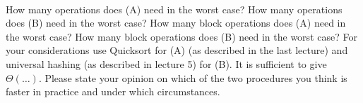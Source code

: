  \\
How many operations does (A) need in the worst case?
How many operations does (B) need in the worst case?
How many block operations does (A) need in the worst case?
How many block operations does (B) need in the worst case?
For your considerations use Quicksort for (A)
(as described in the last lecture) and universal hashing
(as described in lecture 5) for (B).
It is sufficient to give $\Theta (\dots)$.
Please state your opinion on which of the two procedures you think is faster in
practice and under which circumstances.